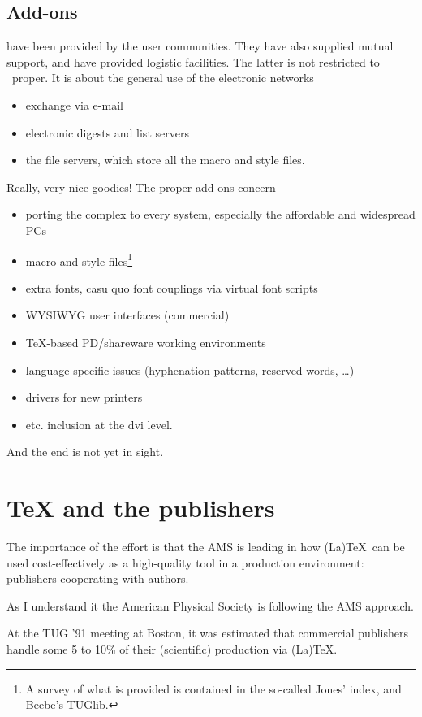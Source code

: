 \subsection{Add-ons}have been provided by the user communities.
They have also supplied mutual support, and have provided logistic facilities.
The latter is not restricted to \AllTeX\ proper.
It is about the general use of the electronic networks
\begin{itemize}
\item exchange via e-mail
\item electronic digests and list servers
\item the file servers, which store all the macro and style files.
\end{itemize}
Really, very nice goodies! The proper add-ons concern
\begin{itemize}
\item porting the complex to every system, especially the affordable
      and widespread PCs
\item macro and style files\footnote{A survey of what is provided is contained
   in the so-called Jones' index, and Beebe's TUGlib.}
\item extra fonts, casu quo font couplings via virtual font scripts
\item WYSIWYG user interfaces (commercial)
\item \TeX-based PD/shareware working environments
\item language-specific issues (hyphenation patterns, reserved words, \ldots)
\item drivers for new printers
\item \PS{} etc.{} inclusion at the dvi level.
\end{itemize}
And the end is not yet in sight.


\section{\TeX{} and the publishers}
The importance of the \AMS{} effort is that the AMS is leading in how (La)\TeX\
can be used cost-effectively as a
high-quality tool in a production environment:
publishers cooperating with authors.

As I understand it the American Physical Society is following
the AMS approach.

At the TUG '91 meeting at Boston, it was estimated that commercial publishers
handle some 5 to 10\% of their (scientific) production via (La)\TeX.

